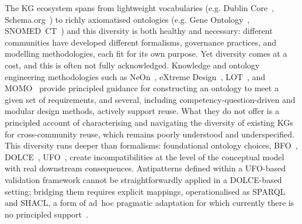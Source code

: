 \documentclass[runningheads]{llncs}
\newenvironment{inboth}{}{}
\begin{document}
\begin{inboth}
\begin{sloppypar}
The KG ecosystem spans from lightweight vocabularies (e.g. Dublin Core~\cite{dcterms}, Schema.org~\cite{schemaorg}) to richly axiomatised ontologies (e.g. Gene Ontology~\cite{gene2019gene}, SNOMED~CT~\cite{chang2021use}) and this diversity is both healthy and necessary: different communities have developed different formalisms, governance practices, and modelling methodologies, each fit for its own purpose. 
Yet diversity comes at a cost, and this is often not fully acknowledged. 
Knowledge and ontology engineering methodologies such as NeOn~\cite{suarez2011neon}, eXtreme Design~\cite{blomqvist2010experimenting}, LOT~\cite{poveda2022lot}, and MOMO~\cite{shimizu2023modular} provide principled guidance for constructing an ontology to meet a given set of requirements, and several, including competency-question-driven and modular design methods, actively support reuse.
What they do not offer is a principled account of characterising and navigating the diversity of existing KGs for cross-community reuse, which remains poorly understood and underspecified.
This diversity runs deeper than formalisms: foundational ontology choices, BFO~\cite{otte2022bfo}, DOLCE~\cite{borgo2022dolce}, UFO~\cite{guizzardi2022ufo}, create incompatibilities at the level of the conceptual model with real downstream consequences. 
Antipatterns defined within a UFO-based validation framework cannot be straightforwardly applied in a DOLCE-based setting; bridging them requires explicit mappings, operationalised as SPARQL and SHACL, a form of ad~hoc pragmatic adaptation for which currently there is no principled support~\cite{sales2015antipatterns,morlidge2026animlontology}.
\end{sloppypar}
\end{inboth}
\end{document}
